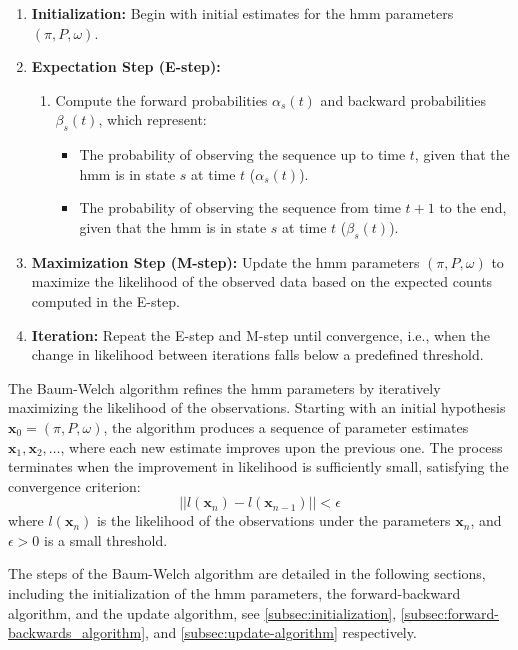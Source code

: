 \begin{enumerate}
    \item \textbf{Initialization:} Begin with initial estimates for the \gls{hmm} parameters $(\pi, P, \omega)$.
    \item \textbf{Expectation Step (E-step):}
    \begin{enumerate}
        \item Compute the forward probabilities $\alpha_s(t)$ and backward probabilities $\beta_s(t)$, which represent:
        \begin{itemize}
            \item The probability of observing the sequence up to time $t$, given that the \gls{hmm} is in state $s$ at time $t$ ($\alpha_s(t)$).
            \item The probability of observing the sequence from time $t+1$ to the end, given that the \gls{hmm} is in state $s$ at time $t$ ($\beta_s(t)$).
        \end{itemize}
    \end{enumerate}
    \item \textbf{Maximization Step (M-step):} Update the \gls{hmm} parameters $(\pi, P, \omega)$ to maximize the likelihood of the observed data based on the expected counts computed in the E-step.
    \item \textbf{Iteration:} Repeat the E-step and M-step until convergence, i.e., when the change in likelihood between iterations falls below a predefined threshold.
    
\end{enumerate}
The Baum-Welch algorithm refines the \gls{hmm} parameters by iteratively maximizing the likelihood of the observations. 
Starting with an initial hypothesis $\textbf{x}_0 = (\pi, P, \omega)$, the algorithm produces a sequence of parameter estimates $\textbf{x}_1, \textbf{x}_2, \ldots$, where each new estimate improves upon the previous one. 
The process terminates when the improvement in likelihood is sufficiently small, satisfying the convergence criterion:
\[
||l(\textbf{x}_n) - l(\textbf{x}_{n-1})|| < \epsilon
\]
where $l(\textbf{x}_n)$ is the likelihood of the observations under the parameters $\textbf{x}_n$, and $\epsilon > 0$ is a small threshold.

The steps of the Baum-Welch algorithm are detailed in the following sections, including the initialization of the \gls{hmm} parameters, the forward-backward algorithm, and the update algorithm, see \autoref{subsec:initialization}, \ref{subsec:forward-backwards_algorithm}, and \ref{subsec:update-algorithm} respectively.

